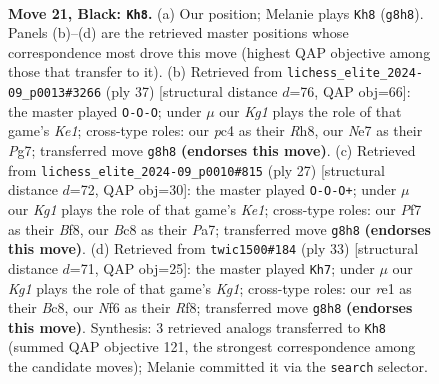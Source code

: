 \documentclass[11pt]{article}
\begin{document}
\clearpage

\begin{figure}[p]\centering
\begin{subfigure}{0.46\textwidth}\centering
\resizebox{\linewidth}{!}{%
\newchessgame
\chessboard[
  setfen={1rb2rk1/p3np2/1p2pnpp/2P5/2P5/N3PB1P/P4PP1/1RB1R1K1 b - - 1 21},
  showmover=false,
  pgfstyle=straightmove, color=movearrow, markmove={g8-h8}
]}
\caption{}
\end{subfigure}\hfill
\begin{subfigure}{0.46\textwidth}\centering
\resizebox{\linewidth}{!}{%
\newchessgame
\chessboard[
  setfen={r3kb1r/1p4p1/p1p1np2/4P2p/2N1P2P/1PP2P2/1P1B1P2/R3K2R b KQkq - 0 19},
  showmover=false,
  pgfstyle=straightmove, color=movearrow, markmove={e8-c8}
]}
\caption{}
\end{subfigure}
\\[4pt]
\begin{subfigure}{0.46\textwidth}\centering
\resizebox{\linewidth}{!}{%
\newchessgame
\chessboard[
  setfen={r3kb1r/pp3p2/2n1pn2/2p4p/4P3/2P1NP2/PPB2P2/R1BK3R b kq - 0 14},
  showmover=false,
  pgfstyle=straightmove, color=movearrow, markmove={e8-c8}
]}
\caption{}
\end{subfigure}\hfill
\begin{subfigure}{0.46\textwidth}\centering
\resizebox{\linewidth}{!}{%
\newchessgame
\chessboard[
  setfen={r1b2rk1/1pp2pp1/p1n5/6p1/PbBp4/3P4/1PPNRPPP/R1B3K1 b - - 1 17},
  showmover=false,
  pgfstyle=straightmove, color=movearrow, markmove={g8-h7}
]}
\caption{}
\end{subfigure}
\caption{\textbf{Move 21, Black: \texttt{Kh8}.} (a) Our position; Melanie plays \texttt{Kh8} (\texttt{g8h8}). Panels (b)--(d) are the retrieved master positions whose correspondence most drove this move (highest QAP objective among those that transfer to it). (b) Retrieved from \texttt{lichess\_elite\_2024-09\_p0013\#3266} (ply 37) [structural distance $d$=76, QAP obj=66]: the master played \texttt{O-O-O}; under $\mu$ our \emph{Kg1} plays the role of that game's \emph{Ke1}; cross-type roles: our \emph{p}c4 as their \emph{R}h8, our \emph{N}e7 as their \emph{P}g7; transferred move \texttt{g8h8} \textbf{(endorses this move)}. (c) Retrieved from \texttt{lichess\_elite\_2024-09\_p0010\#815} (ply 27) [structural distance $d$=72, QAP obj=30]: the master played \texttt{O-O-O+}; under $\mu$ our \emph{Kg1} plays the role of that game's \emph{Ke1}; cross-type roles: our \emph{P}f7 as their \emph{B}f8, our \emph{B}c8 as their \emph{P}a7; transferred move \texttt{g8h8} \textbf{(endorses this move)}. (d) Retrieved from \texttt{twic1500\#184} (ply 33) [structural distance $d$=71, QAP obj=25]: the master played \texttt{Kh7}; under $\mu$ our \emph{Kg1} plays the role of that game's \emph{Kg1}; cross-type roles: our \emph{r}e1 as their \emph{B}c8, our \emph{N}f6 as their \emph{R}f8; transferred move \texttt{g8h8} \textbf{(endorses this move)}. Synthesis: 3 retrieved analogs transferred to \texttt{Kh8} (summed QAP objective 121, the strongest correspondence among the candidate moves); Melanie committed it via the \texttt{search} selector.}
\label{fig:thought-m41}
\end{figure}
\end{document}
